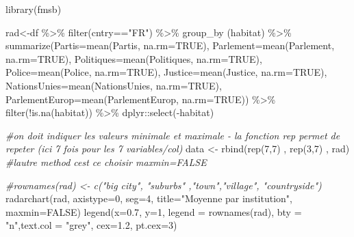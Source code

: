 \documentclass[
]{book}
\newenvironment{Shaded}{\begin{snugshade}}{\end{snugshade}}
\newcommand{\AttributeTok}[1]{\textcolor[rgb]{0.77,0.63,0.00}{#1}}
\newcommand{\CommentTok}[1]{\textcolor[rgb]{0.56,0.35,0.01}{\textit{#1}}}
\newcommand{\ConstantTok}[1]{\textcolor[rgb]{0.00,0.00,0.00}{#1}}
\newcommand{\DecValTok}[1]{\textcolor[rgb]{0.00,0.00,0.81}{#1}}
\newcommand{\FloatTok}[1]{\textcolor[rgb]{0.00,0.00,0.81}{#1}}
\newcommand{\FunctionTok}[1]{\textcolor[rgb]{0.00,0.00,0.00}{#1}}
\newcommand{\NormalTok}[1]{#1}
\newcommand{\OtherTok}[1]{\textcolor[rgb]{0.56,0.35,0.01}{#1}}
\newcommand{\SpecialCharTok}[1]{\textcolor[rgb]{0.00,0.00,0.00}{#1}}
\newcommand{\StringTok}[1]{\textcolor[rgb]{0.31,0.60,0.02}{#1}}
\begin{document}
\begin{Shaded}
\begin{Highlighting}[]
\FunctionTok{library}\NormalTok{(fmsb)}

\NormalTok{rad}\OtherTok{\textless{}{-}}\NormalTok{df }\SpecialCharTok{\%\textgreater{}\%} \FunctionTok{filter}\NormalTok{(cntry}\SpecialCharTok{==}\StringTok{"FR"}\NormalTok{) }\SpecialCharTok{\%\textgreater{}\%}
  \FunctionTok{group\_by}\NormalTok{ (habitat) }\SpecialCharTok{\%\textgreater{}\%}
  \FunctionTok{summarize}\NormalTok{(}\AttributeTok{Partis=}\FunctionTok{mean}\NormalTok{(Partis, }\AttributeTok{na.rm=}\ConstantTok{TRUE}\NormalTok{),}
  \AttributeTok{Parlement=}\FunctionTok{mean}\NormalTok{(Parlement, }\AttributeTok{na.rm=}\ConstantTok{TRUE}\NormalTok{),}
  \AttributeTok{Politiques=}\FunctionTok{mean}\NormalTok{(Politiques, }\AttributeTok{na.rm=}\ConstantTok{TRUE}\NormalTok{),}
  \AttributeTok{Police=}\FunctionTok{mean}\NormalTok{(Police, }\AttributeTok{na.rm=}\ConstantTok{TRUE}\NormalTok{),}
  \AttributeTok{Justice=}\FunctionTok{mean}\NormalTok{(Justice, }\AttributeTok{na.rm=}\ConstantTok{TRUE}\NormalTok{),}
  \AttributeTok{NationsUnies=}\FunctionTok{mean}\NormalTok{(NationsUnies, }\AttributeTok{na.rm=}\ConstantTok{TRUE}\NormalTok{),}
  \AttributeTok{ParlementEurop=}\FunctionTok{mean}\NormalTok{(ParlementEurop, }\AttributeTok{na.rm=}\ConstantTok{TRUE}\NormalTok{)) }\SpecialCharTok{\%\textgreater{}\%} 
  \FunctionTok{filter}\NormalTok{(}\SpecialCharTok{!}\FunctionTok{is.na}\NormalTok{(habitat)) }\SpecialCharTok{\%\textgreater{}\%} 
\NormalTok{  dplyr}\SpecialCharTok{::}\FunctionTok{select}\NormalTok{(}\SpecialCharTok{{-}}\NormalTok{habitat)}

\CommentTok{\#on doit indiquer les valeurs minimale et maximale {-} la fonction rep permet de repeter (ici 7 fois pour les 7 variables/col)}
\NormalTok{data }\OtherTok{\textless{}{-}} \FunctionTok{rbind}\NormalTok{(}\FunctionTok{rep}\NormalTok{(}\DecValTok{7}\NormalTok{,}\DecValTok{7}\NormalTok{) , }\FunctionTok{rep}\NormalTok{(}\DecValTok{3}\NormalTok{,}\DecValTok{7}\NormalTok{) , rad)}
\CommentTok{\#l\textquotesingle{}autre method c\textquotesingle{}est ce choisir maxmin=FALSE}

\CommentTok{\#rownames(rad) \textless{}{-} c("big city", "suburbs" ,"town","village", "countryside")}
\FunctionTok{radarchart}\NormalTok{(rad, }\AttributeTok{axistype=}\DecValTok{0}\NormalTok{, }\AttributeTok{seg=}\DecValTok{4}\NormalTok{, }\AttributeTok{title=}\StringTok{"Moyenne par institution"}\NormalTok{, }\AttributeTok{maxmin=}\ConstantTok{FALSE}\NormalTok{)}
\FunctionTok{legend}\NormalTok{(}\AttributeTok{x=}\FloatTok{0.7}\NormalTok{, }\AttributeTok{y=}\DecValTok{1}\NormalTok{, }\AttributeTok{legend =} \FunctionTok{rownames}\NormalTok{(rad), }\AttributeTok{bty =} \StringTok{"n"}\NormalTok{,}\AttributeTok{text.col =} \StringTok{"grey"}\NormalTok{, }\AttributeTok{cex=}\FloatTok{1.2}\NormalTok{, }\AttributeTok{pt.cex=}\DecValTok{3}\NormalTok{)}
\end{Highlighting}
\end{Shaded}
\end{document}
